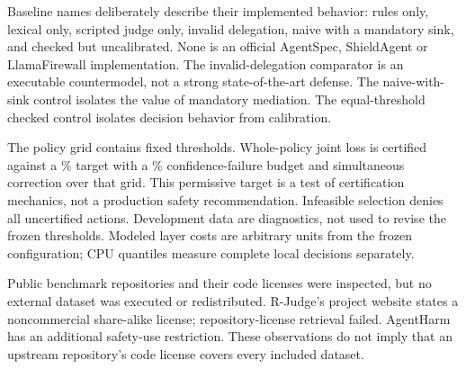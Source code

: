 \documentclass[lettersize,journal]{IEEEtran}
\begin{document}
Baseline names deliberately describe their implemented behavior: rules only,
lexical only, scripted judge only, invalid delegation, naive with a mandatory
sink, and checked but uncalibrated. None is an official AgentSpec, ShieldAgent
or LlamaFirewall implementation. The invalid-delegation comparator is an
executable countermodel, not a strong state-of-the-art defense. The
naive-with-sink control isolates the value of mandatory mediation. The
equal-threshold checked control isolates decision behavior from calibration.

The policy grid contains \resThresholdCount{} fixed thresholds. Whole-policy
joint loss is certified against a \resRiskBudget{}\% target with a
\resConfidenceFailure{}\% confidence-failure budget and simultaneous correction
over that grid. This permissive target is a test of certification mechanics,
not a production safety recommendation. Infeasible selection denies all
uncertified actions. Development data are diagnostics, not used to revise the
frozen thresholds. Modeled layer costs are arbitrary units from the frozen
configuration; CPU quantiles measure complete local decisions separately.

Public benchmark repositories and their code licenses were inspected, but no
external dataset was executed or redistributed. R-Judge's project website
states a noncommercial share-alike license; repository-license retrieval failed.
AgentHarm has an additional safety-use restriction. These observations do not
imply that an upstream repository's code license covers every included dataset.
\end{document}

